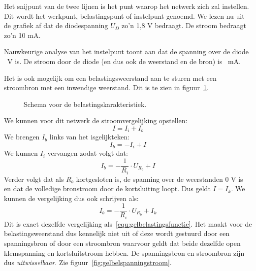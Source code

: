 Het snijpunt van de twee lijnen is het punt waarop het netwerk zich zal instellen. Dit wordt het werkpunt,
belastingspunt of instelpunt genoemd. We lezen nu uit de grafiek af dat de diodespanning $U_D$ zo'n 1,8 V
bedraagt. De stroom bedraagt zo'n 10 mA.

Nauwkeurige analyse van het instelpunt toont aan dat de spanning over de diode \udiode\ V is. De stroom door de
diode (en dus ook de weerstand en de bron) is \idiode\ mA.

Het is ook mogelijk om een belastingsweerstand aan te sturen met een stroombron met een inwendige weerstand.
Dit is te zien in figuur~\ref{fig:gelschemavoorbelastingskarakteristiekstroombron}.

\begin{figure}[!ht]
\centering
{}
\caption{Schema voor de belastingskarakteristiek.}
\label{fig:gelschemavoorbelastingskarakteristiekstroombron}
\end{figure}

We kunnen voor dit netwerk de stroomvergelijking opstellen:
%
\begin{equation}
I = I_i + I_b
\end{equation}
%
We brengen $I_b$ links van het isgelijkteken:
\begin{equation}
I_b = -I_i + I
\end{equation}
%
We kunnen $I_i$ vervangen zodat volgt dat:
%
\begin{equation}
I_b = -\dfrac{1}{R_i}\cdot U_{R_b} + I
\end{equation}
%
Verder volgt dat als $R_b$ kortgesloten is, de spanning over de weerstanden 0 V is en dat de
volledige bronstroom door de kortsluiting loopt. Dus geldt $I=I_k$. We kunnen de vergelijking
dus ook schrijven als:
%
\begin{equation}
I_b = -\dfrac{1}{R_i}\cdot U_{R_b} + I_k
\end{equation}
%
Dit is exact dezelfde vergelijking als~\eqref{equ:gelbelastingsfunctie}. Het maakt voor de
belastingsweerstand dus kennelijk niet uit of deze wordt gestuurd door een spanningsbron of door een
stroombron waarvoor geldt dat beide dezelfde open klemspanning en kortsluitstroom hebben. De
spanningsbron en stroombron zijn dus \textsl{uitwisselbaar}. Zie figuur~\ref{fig:gelbelspanningstroom}.


